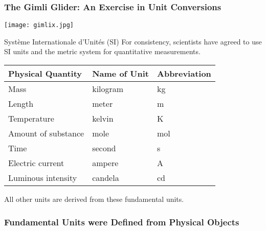 \documentclass[notes=show]{beamer}
\begin{document}
\begin{frame}[c]
	\frametitle{The Gimli Glider: An Exercise in Unit Conversions}
	\begin{center}
		\texttt{[image: gimlix.jpg]}
	\end{center}
\end{frame}

\begin{frame}{Système Internationale d'Unités (SI)}
	For consistency, scientists have agreed to use \alert{SI units} and the
	\alert{metric system} for quantitative measurements.

	\begin{center}
		\renewcommand\arraystretch{1.1}
		\begin{tabular}{l@{\qquad}l@{\qquad}l}
			\toprule
			\bfseries Physical Quantity & \bfseries Name of Unit &
			\bfseries Abbreviation \\ \midrule
			Mass                & kilogram & \si{\kilo\gram }\\
			Length              & meter    & \si{\meter     }\\
			Temperature         & kelvin   & \si{\kelvin    }\\
			Amount of substance & mole     & \si{\mole      }\\
			Time                & second   & \si{\second    }\\
			Electric current    & ampere   & \si{\ampere    }\\
			Luminous intensity  & candela  & \si{\candela   }\\
			\bottomrule
		\end{tabular}
	\end{center}

	\begin{center}
		All other units are derived from these \alert{fundamental} units.
	\end{center}
\end{frame}

\begin{frame}[c]
	\frametitle{Fundamental Units were Defined from Physical Objects}

	\begin{center}
	\end{center}
\end{frame}
\end{document}
